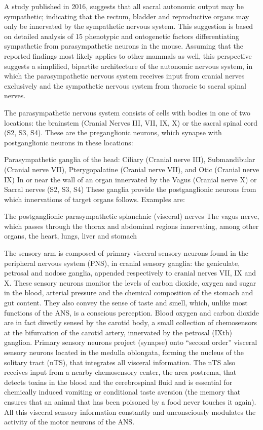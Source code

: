\documentclass[]{book}
\begin{document}
A study published in 2016, suggests that all sacral autonomic output may be sympathetic; indicating that the rectum, bladder and reproductive organs may only be innervated by the sympathetic nervous system. This suggestion is based on detailed analysis of 15 phenotypic and ontogenetic factors differentiating sympathetic from parasympathetic neurons in the mouse. Assuming that the reported findings most likely applies to other mammals as well, this perspective suggests a simplified, bipartite architecture of the autonomic nervous system, in which the parasympathetic nervous system receives input from cranial nerves exclusively and the sympathetic nervous system from thoracic to sacral spinal nerves.

The parasympathetic nervous system consists of cells with bodies in one of two locations: the brainstem (Cranial Nerves III, VII, IX, X) or the sacral spinal cord (S2, S3, S4). These are the preganglionic neurons, which synapse with postganglionic neurons in these locations:

Parasympathetic ganglia of the head: Ciliary (Cranial nerve III), Submandibular (Cranial nerve VII), Pterygopalatine (Cranial nerve VII), and Otic (Cranial nerve IX)
In or near the wall of an organ innervated by the Vagus (Cranial nerve X) or Sacral nerves (S2, S3, S4)
These ganglia provide the postganglionic neurons from which innervations of target organs follows. Examples are:

The postganglionic parasympathetic splanchnic (visceral) nerves
The vagus nerve, which passes through the thorax and abdominal regions innervating, among other organs, the heart, lungs, liver and stomach

The sensory arm is composed of primary visceral sensory neurons found in the peripheral nervous system (PNS), in cranial sensory ganglia: the geniculate, petrosal and nodose ganglia, appended respectively to cranial nerves VII, IX and X. These sensory neurons monitor the levels of carbon dioxide, oxygen and sugar in the blood, arterial pressure and the chemical composition of the stomach and gut content. They also convey the sense of taste and smell, which, unlike most functions of the ANS, is a conscious perception. Blood oxygen and carbon dioxide are in fact directly sensed by the carotid body, a small collection of chemosensors at the bifurcation of the carotid artery, innervated by the petrosal (IXth) ganglion. Primary sensory neurons project (synapse) onto ``second order'' visceral sensory neurons located in the medulla oblongata, forming the nucleus of the solitary tract (nTS), that integrates all visceral information. The nTS also receives input from a nearby chemosensory center, the area postrema, that detects toxins in the blood and the cerebrospinal fluid and is essential for chemically induced vomiting or conditional taste aversion (the memory that ensures that an animal that has been poisoned by a food never touches it again). All this visceral sensory information constantly and unconsciously modulates the activity of the motor neurons of the ANS.
\end{document}

